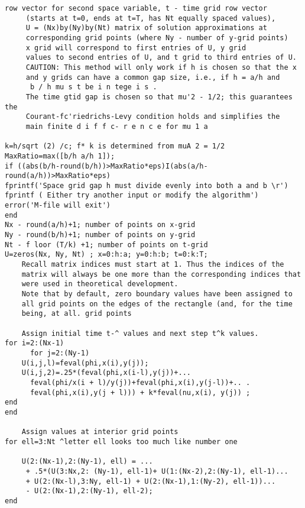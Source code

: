 \documentclass[../main.tex]{subfiles}
\begin{document}
{{\begin{lstlisting}[numbers=none]
	 row vector for second space variable, t - time grid row vector 
	 (starts at t=0, ends at t=T, has Nt equally spaced values), 
	 U = (Nx)by(Ny)by(Nt) matrix of solution approximations at 
	 corresponding grid points (where Ny - number of y-grid points) 
	 x grid will correspond to first entries of U, y grid 
	 values to second entries of U, and t grid to third entries of U. 
	 CAUTION: This method will only work if h is chosen so that the x 
	 and y grids can have a common gap size, i.e., if h = a/h and 
	  b / h mu s t be i n tege i s . 
	 The time gtid gap is chosen so that mu'2 - 1/2; this guarantees the 
	 Courant-fc'riedrichs-Levy condition holds and simplifies the 
	 main finite d i f f c- r e n c e for mu 1 a
	 
k=h/sqrt (2) /c; f* k is determined from muA 2 = 1/2 
MaxRatio=max([b/h a/h 1]); 
if ((abs(b/h-round(b/h))>MaxRatio*eps)I(abs(a/h-
round(a/h))>MaxRatio*eps)  
fprintf('Space grid gap h must divide evenly into both a and b \r') 
fprintf ( Either try another input or modify the algorithm') 
error('M-file will exit') 
end 
Nx - round(a/h)+1; number of points on x-grid 
Ny - round(b/h)+1; number of points on y-grid 
Nt - f loor (T/k) +1; number of points on t-grid 
U=zeros(Nx, Ny, Nt) ; x=0:h:a; y=0:h:b; t=0:k:T;
	Recall matrix indices must start at 1. Thus the indices of the 
	matrix will always be one more than the corresponding indices that 
	were used in theoretical development. 
	Note that by default, zero boundary values have been assigned to 
	all grid points on the edges of the rectangle (and, for the time 
	being, at all. grid points
	
	Assign initial time t-^ values and next step t^k values. 
for i=2:(Nx-1) 
	  for j=2:(Ny-1) 
	U(i,j,l)=feval(phi,x(i),y(j)); 
	U(i,j,2)=.25*(feval(phi,x(i-l),y(j))+... 
	  feval(phi/x(i + l)/y(j))+feval(phi,x(i),y(j-l))+.. . 
	  feval(phi,x(i),y(j + l))) + k*feval(nu,x(i), y(j)) ; 
end 
end 

	Assign values at interior grid points 
for ell=3:Nt ^letter ell looks too much like number one 

	U(2:(Nx-1),2:(Ny-1), ell) = ... 
	 + .5*(U(3:Nx,2: (Ny-1), ell-1)+ U(1:(Nx-2),2:(Ny-1), ell-1)... 
	 + U(2:(Nx-l),3:Ny, ell-1) + U(2:(Nx-1),1:(Ny-2), ell-1))... 
	 - U(2:(Nx-1),2:(Ny-1), ell-2); 
end 
\end{lstlisting}
}}
\end{document}
